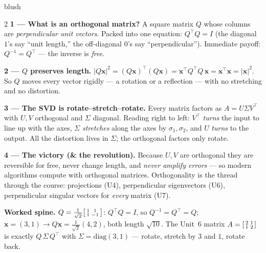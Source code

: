 \documentclass[10pt]{article}
\newcommand{\xx}{\mathbf{x}}
\newcommand{\T}{^{\top}}
\begin{document}
\begin{skillbox}[Lesson]{blush}
\begin{multicols}{2}
\textbf{1 --- What is an orthogonal matrix?} A square matrix $Q$ whose columns are \emph{perpendicular unit
vectors}. Packed into one equation: $Q\T Q=I$ (the diagonal $1$'s say ``unit length,'' the off-diagonal $0$'s
say ``perpendicular''). Immediate payoff: $Q^{-1}=Q\T$ --- the inverse is \emph{free}.

\textbf{2 --- $Q$ preserves length.} $|Q\xx|^2=(Q\xx)\T(Q\xx)=\xx\T Q\T Q\,\xx=\xx\T\xx=|\xx|^2$. So $Q$ moves
every vector rigidly --- a rotation or a reflection --- with no stretching and no distortion.

\columnbreak

\textbf{3 --- The SVD is rotate--stretch--rotate.} Every matrix factors as $A=U\Sigma V\T$ with $U,V$
orthogonal and $\Sigma$ diagonal. Reading right to left: $V\T$ \emph{turns} the input to line up with the axes,
$\Sigma$ \emph{stretches} along the axes by $\sigma_1,\sigma_2$, and $U$ \emph{turns} to the output. All the
distortion lives in $\Sigma$; the orthogonal factors only rotate.

\textbf{4 --- The victory (\& the revolution).} Because $U,V$ are orthogonal they are reversible for free,
never change length, and \emph{never amplify errors} --- so modern algorithms compute with orthogonal matrices.
Orthogonality is the thread through the course: projections (U4), perpendicular eigenvectors (U6), perpendicular
singular vectors for \emph{every} matrix (U7).
\end{multicols}

\vspace{2pt}
\textbf{Worked spine.} $Q=\tfrac1{\sqrt2}\begin{bsmallmatrix} 1 & 1\\ 1 & -1 \end{bsmallmatrix}$: $Q\T Q=I$, so
$Q^{-1}=Q\T=Q$; $\xx=(3,1)\to Q\xx=\tfrac1{\sqrt2}(4,2)$, both length $\sqrt{10}$. The Unit~6 matrix
$A=\begin{bsmallmatrix} 2 & 1\\ 1 & 2 \end{bsmallmatrix}$ is exactly $Q\,\Sigma\,Q\T$ with $\Sigma=\mathrm{diag}(3,1)$
--- rotate, stretch by $3$ and $1$, rotate back.
\end{skillbox}
\end{document}
